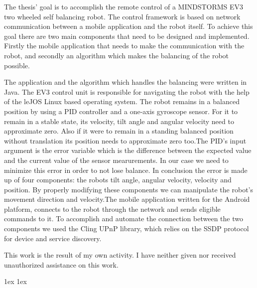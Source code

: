 \documentclass[final]{ubb_dolgozat}
\author{
Márton Zete-Örs
}
\begin{document}
\begin{abstractEN}
	
The thesis’ goal is to accomplish the remote control of  a MINDSTORMS EV3 two wheeled self balancing robot. The control framework is based on  network  communication between a mobile application and the robot itself. To achieve this goal there are two main components that need to be designed and implemented. Firstly the mobile application that needs to make the communication with the robot, and secondly an algorithm which makes the balancing of the robot possible.

The application and the algorithm which handles the balancing were written in Java. The EV3 control unit is responsible for navigating the robot with the help of the leJOS Linux based operating system. The robot remains in a balanced position by using a PID controller and a one-axis gyroscope sensor. For it to remain in a stable  state, its velocity, tilt angle and angular velocity need to approximate zero. Also if it were to remain in a standing balanced position without translation its position needs to approximate zero too.The PID’s input argument is the error variable which is the difference between the expected value and the current value of the sensor mearurements. In our case we need to minimize this error in order to not lose  balance. In conclusion the error is made up of four components: the robots tilt angle, angular velocity, velocity and position. By properly modifying these components we can manipulate the robot’s movement direction and velocity.The mobile application written for the Android platform, connects to the robot through the network and sends eligible commands to it. To accomplish and automate the connection between the two components we used the Cling UPnP library, which relies on the SSDP protocol for device and service discovery.

This work is the result of my own activity. I have neither given nor received unauthorized assistance on this work.
\vspace{-1cm}
\end{abstractEN}

\maketitle

{ \baselineskip 1ex
  \parskip 1ex
  \tableofcontents
}






\appendix

{ 
	\renewcommand{\baselinestretch}{1.4}\normalsize %
	\setlength{\itemsep}{-2.4mm}
	\setlength{\bibspacing}{0.67\baselineskip}
	
	
}
\end{document}
